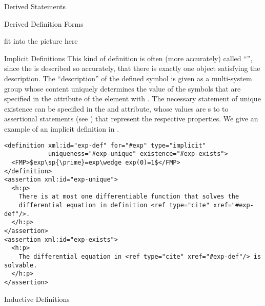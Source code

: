 \begin{omgroup}{Derived Statements}
\begin{module}[id=derived-defs]
\begin{omgroup}[short=Derived Definitions]{Derived Definition Forms}
\begin{oldpart}{fit into the picture here}
\begin{module}[id=implicit-defs]
\begin{omgroup}{Implicit Definitions}
This kind of definition is often (more accurately) called ``{\emph{}}'', since the {} is described so accurately,
that there is exactly one object satisfying the description. The ``description'' of the
defined symbol is given as a multi-system {} group whose content uniquely
determines the value of the symbols that are specified in the
{} attribute of the {} element with
{} {}.  The necessary
statement of unique existence can be specified in the {}
and {} attribute, whose values are
{s} to to assertional statements (see
) that represent the respective properties.  We give
an example of an implicit definition in {}.

\begin{lstlisting}[label=lst:exp-def,mathescape,
  caption={An Implicit Definition of the Exponential Function},
  index={definition,assertion,type,uniqueness,existence}]
<definition xml:id="exp-def" for="#exp" type="implicit" 
            uniqueness="#exp-unique" existence="#exp-exists">
  <FMP>$exp\sp{\prime}=exp\wedge exp(0)=1$</FMP>
</definition>
<assertion xml:id="exp-unique">
  <h:p>
    There is at most one differentiable function that solves the 
    differential equation in definition <ref type="cite" xref="#exp-def"/>.
  </h:p>
</assertion>
<assertion xml:id="exp-exists">
  <h:p>
    The differential equation in <ref type="cite" xref="#exp-def"/> is solvable.
  </h:p>
</assertion>
\end{lstlisting}
\end{omgroup}
\end{module}

\begin{module}[id=inductive-defs]
\begin{omgroup}{Inductive Definitions}


\end{omgroup}
\end{module}
\end{oldpart}
\end{omgroup}
\end{module}
\end{omgroup}
